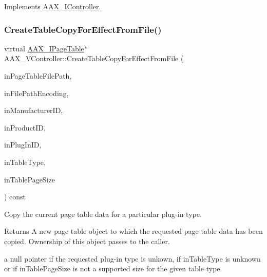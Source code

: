 Implements \mbox{\hyperlink{a01789_ab35931f5055849da04566d51e17665af}{A\+A\+X\+\_\+\+I\+Controller}}.

\mbox{\label{a01905_aca7ea0ddba3b3a6ae714813f12ec0515}} 
\subsubsection{\texorpdfstring{CreateTableCopyForEffectFromFile()}{CreateTableCopyForEffectFromFile()}}
{\footnotesize\ttfamily virtual \mbox{\hyperlink{a01849}{A\+A\+X\+\_\+\+I\+Page\+Table}}$\ast$ A\+A\+X\+\_\+\+V\+Controller\+::\+Create\+Table\+Copy\+For\+Effect\+From\+File (\begin{DoxyParamCaption}\item[{const char $\ast$}]{in\+Page\+Table\+File\+Path,  }\item[{\mbox{\hyperlink{a00491_a8152e57310850693e4e7f00fc4922d74}{A\+A\+X\+\_\+\+E\+Text\+Encoding}}}]{in\+File\+Path\+Encoding,  }\item[{\mbox{\hyperlink{a00392_ab247c0d8686c14e05cbb567ef276f249}{A\+A\+X\+\_\+\+C\+Property\+Value}}}]{in\+Manufacturer\+ID,  }\item[{\mbox{\hyperlink{a00392_ab247c0d8686c14e05cbb567ef276f249}{A\+A\+X\+\_\+\+C\+Property\+Value}}}]{in\+Product\+ID,  }\item[{\mbox{\hyperlink{a00392_ab247c0d8686c14e05cbb567ef276f249}{A\+A\+X\+\_\+\+C\+Property\+Value}}}]{in\+Plug\+In\+ID,  }\item[{uint32\+\_\+t}]{in\+Table\+Type,  }\item[{int32\+\_\+t}]{in\+Table\+Page\+Size }\end{DoxyParamCaption}) const\hspace{0.3cm}{\ttfamily [virtual]}}



Copy the current page table data for a particular plug-\/in type. 

\begin{DoxyReturn}{Returns}
A new page table object to which the requested page table data has been copied. Ownership of this object passes to the caller.

a null pointer if the requested plug-\/in type is unkown, if {\ttfamily in\+Table\+Type} is unknown or if {\ttfamily in\+Table\+Page\+Size} is not a supported size for the given table type.
\end{DoxyReturn}

